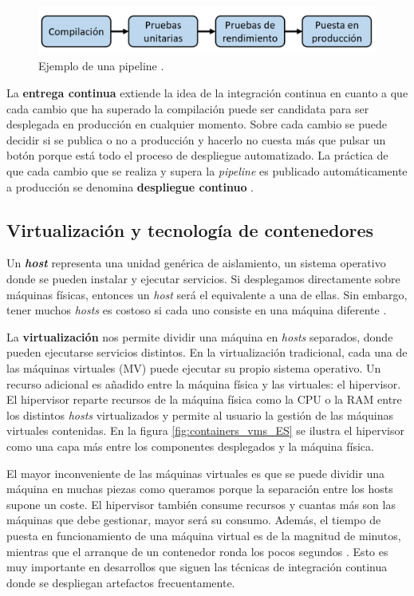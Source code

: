\documentclass[11pt,spanish,listoffigures]{tfgetsinf}
\begin{document}
\begin{figure}[h]
\centering
\includegraphics[scale=0.6]{pipeline_ES}
\caption{Ejemplo de una pipeline \cite{Newman2015a}.}
\end{figure}

La \textbf{entrega continua} extiende la idea de la integración continua en cuanto a que cada cambio que ha superado la compilación puede ser candidata para ser desplegada en producción en cualquier momento. Sobre cada cambio se puede decidir si se publica o no a producción y hacerlo no cuesta más que pulsar un botón porque está todo el proceso de despliegue automatizado. La práctica de que cada cambio que se realiza y supera la \textit{pipeline} es publicado automáticamente a producción se denomina \textbf{despliegue continuo} \cite{Fowler2013}.

\subsection{Virtualización y tecnología de contenedores}

Un \textbf{\textit{host}} representa una unidad genérica de aislamiento, un sistema operativo donde se pueden instalar y ejecutar servicios. Si desplegamos directamente sobre máquinas físicas, entonces un \textit{host} será el equivalente a una de ellas. Sin embargo, tener muchos \textit{hosts} es costoso si cada uno consiste en una máquina diferente \cite{Newman2015a}.

La \textbf{virtualización} nos permite dividir una máquina en \textit{hosts} separados, donde pueden ejecutarse servicios distintos. En la virtualización tradicional, cada una de las máquinas virtuales (MV) puede ejecutar su propio sistema operativo. Un recurso adicional es añadido entre la máquina física y las virtuales: el hipervisor. El hipervisor reparte recursos de la máquina física como la CPU o la RAM entre los distintos \textit{hosts} virtualizados y permite al usuario la gestión de las máquinas virtuales contenidas. En la figura \ref{fig:containers_vms_ES} se ilustra el hipervisor como una capa más entre los componentes desplegados y la máquina física.

El mayor inconveniente de las máquinas virtuales es que se puede dividir una máquina en muchas piezas como queramos porque la separación entre los hosts supone un coste. El hipervisor también consume recursos y cuantas más son las máquinas que debe gestionar, mayor será su consumo. Además, el tiempo de puesta en funcionamiento de una máquina virtual es de la magnitud de minutos, mientras que el arranque de un contenedor ronda los pocos segundos \cite{Dua2014}. Esto es muy importante en desarrollos que siguen las técnicas de integración continua donde se despliegan artefactos frecuentamente. 
\end{document}
